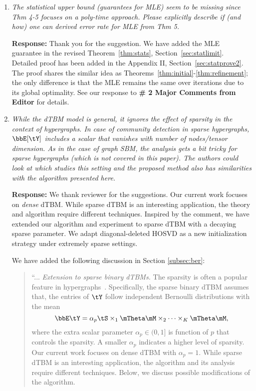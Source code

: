 \documentclass[11pt]{article}
\theoremstyle{definition}
\theoremstyle{definition}
\begin{document}
\begin{enumerate}[wide, labelwidth=!, labelindent=0pt]

\item \textit{The statistical upper bound (guarantees for MLE) seem to be missing since Thm 4-5 focuses on a poly-time approach. Please explicitly describe if (and how) one can derived error rate for MLE from Thm 5.}

\textbf{Response:} Thank you for the suggestion. We have added the MLE guarantee in the revised Theorem~\ref{thm:stats}, Section~\ref{sec:statlimit}. Detailed proof has been added in the Appendix II, Section~\ref{sec:statprove2}. The proof shares the similar idea as Theorems~\ref{thm:initial}-\ref{thm:refinement}; the only difference is that the MLE remains the same over iterations due to its global optimality. See our response to \textbf{\# 2 Major Comments from Editor} for details. 


\item \textit{While the dTBM model is general, it ignores the effect of sparsity in the context of hypergraphs. In case of community detection in sparse hypergraphs, $\bbE[\tY]$ includes a scalar that vanishes with number of nodes/tensor dimension. As in the case of graph SBM, the analysis gets a bit tricky for sparse hypergraphs (which is not covered in this paper). The authors could look at \cite{florescu2016spectral} which studies this setting and the proposed method also has similarities with the algorithm presented here.}


\textbf{Response:} We thank reviewer for the suggestions. Our current work focuses on \emph{dense} dTBM. While sparse dTBM is an interesting application, the theory and algorithm require different techniques. 
Inspired by the comment, we have extended our algorithm and experiment to sparse dTBM with a decaying sparse parameter. We adapt diagonal-deleted HOSVD as a new initialization strategy under extremely sparse settings. 

We have added the following discussion in Section \ref{subsec:ber}:

\begin{quote}
    ``... \textit{Extension to sparse binary dTBMs.} The sparsity is often a popular feature in hypergraphs~\citep{florescu2016spectral,ke2019community}. Specifically, the sparse binary dTBM assumes that, the entries of $\tY$ follow independent Bernoulli distributions with the mean
     \begin{equation}\label{eq:sparse_dtbm}
    \bbE\tY = \alpha_p \tS \times_1 \mTheta \mM \times_2  \cdots \times_K \mTheta \mM,
\end{equation}
where the extra scalar parameter $\alpha_p \in (0,1]$ is function of $p$ that controls the sparsity. A smaller $\alpha_p$ indicates a higher level of sparsity. Our current work focuses on dense dTBM with $\alpha_p=1$.  While sparse dTBM is an interesting application, the algorithm and its analysis require different techniques. Below, we discuss possible modifications of the algorithm. 


\end{quote}
\end{enumerate}
\end{document}
